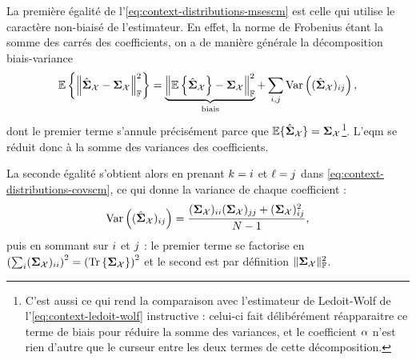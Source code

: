 \begin{remark}
  La première égalité de l'\cref{eq:context-distributions-msescm} est celle qui utilise le caractère non-biaisé de l'estimateur. En effet, la norme de Frobenius étant la somme des carrés des coefficients, on a de manière générale la décomposition biais-variance
  $$
    \operatorname{\mathbb{E}}\left\{\left\|\hat{\boldsymbol{\Sigma}}_{\mathcal{X}} - \boldsymbol{\Sigma}_{\mathcal{X}}\right\|_{\mathbb{F}}^2\right\}
    =
    \underbrace{
      \left\|\operatorname{\mathbb{E}}\left\{\hat{\boldsymbol{\Sigma}}_{\mathcal{X}}\right\} - \boldsymbol{\Sigma}_{\mathcal{X}}\right\|_{\mathbb{F}}^2
    }_{\text{biais}}
    +
    \sum_{i,j}
    \operatorname{\operatorname{Var}}\left((\hat{\boldsymbol{\Sigma}}_{\mathcal{X}})_{ij}\right),
  $$
  dont le premier terme s'annule précisément parce que $\operatorname{\mathbb{E}}\{\hat{\boldsymbol{\Sigma}}_{\mathcal{X}}\}=\boldsymbol{\Sigma}_{\mathcal{X}}$\footnote{C'est aussi ce qui rend la comparaison avec l'estimateur de Ledoit-Wolf de l'\cref{eq:context-ledoit-wolf} instructive : celui-ci fait délibérément réapparaitre ce terme de biais pour réduire la somme des variances, et le coefficient $\alpha$ n'est rien d'autre que le curseur entre les deux termes de cette décomposition.}. L'eqm se réduit donc à la somme des variances des coefficients.

  La seconde égalité s'obtient alors en prenant $k=i$ et $\ell=j$ dans \cref{eq:context-distributions-covscm}, ce qui donne la variance de chaque coefficient :
  $$
    \operatorname{\operatorname{Var}}\left((\hat{\boldsymbol{\Sigma}}_{\mathcal{X}})_{ij}\right)
    =
    \frac{
      (\boldsymbol{\Sigma}_{\mathcal{X}})_{ii}(\boldsymbol{\Sigma}_{\mathcal{X}})_{jj}
      + (\boldsymbol{\Sigma}_{\mathcal{X}})_{ij}^2
    }{N-1},
  $$
  puis en sommant sur $i$ et $j$ : le premier terme se factorise en $\left(\sum_i (\boldsymbol{\Sigma}_{\mathcal{X}})_{ii}\right)^2 = \left(\operatorname{\operatorname{Tr}}\left\{\boldsymbol{\Sigma}_{\mathcal{X}}\right\}\right)^2$ et le second est par définition $\|\boldsymbol{\Sigma}_{\mathcal{X}}\|_{\mathbb{F}}^2$.
\end{remark}

